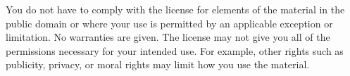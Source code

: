 { You do not have to comply with the license for elements of the
 material in the public domain or where your use is permitted by an
 applicable exception or limitation. No warranties are given. The
 license may not give you all of the permissions necessary for your
 intended use. For example, other rights such as publicity,
 privacy, or moral rights may limit how you use the material.

 \clearpage

 \thispagestyle{plain}
 \par
}
\makeatother
